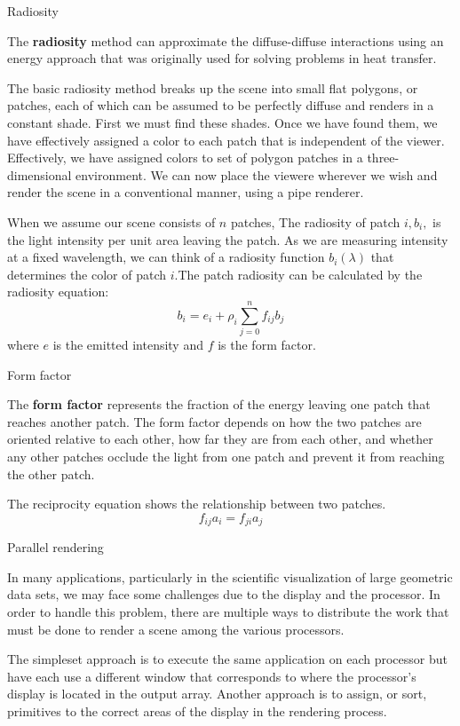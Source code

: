 \documentclass[10pt,a4paper]{article}
\begin{document}
\begin{enumerate}
		{\large \item Radiosity}
		
		The \textbf{radiosity} method can approximate the diffuse-diffuse interactions using an energy approach that was originally used for solving problems in heat transfer.
		
		The basic radiosity method breaks up the scene into small flat polygons, or patches, each of which can be assumed to be perfectly diffuse and renders in a constant shade. First we must find these shades. Once we have found them, we have effectively assigned a color to each patch that is independent of the viewer.
		Effectively, we have assigned colors to set of polygon patches in a three-dimensional environment. We can now place the viewere wherever we wish and render the scene in a conventional manner, using a pipe renderer.
		
		When we assume our scene consists of $ n $ patches, The radiosity of patch $ i, b_i, $ is the light intensity per unit area leaving the patch. As we are measuring intensity at a fixed wavelength, we can think of a radiosity function $ b_i(\lambda) $ that determines the color of patch $ i $.The patch radiosity can be calculated by the radiosity equation: $$ b_i = e_i + \rho_i \sum_{j=0}^{n} f_{ij} b_j $$ where $ e $ is the emitted intensity and $ f $ is the form factor.\\
		
		{\large \item Form factor}
		
		The \textbf{form factor} represents the fraction of the energy leaving one patch that reaches another patch. The form factor depends on how the two patches are oriented relative to each other, how far they are from each other, and whether any other patches occlude the light from one patch and prevent it from reaching the other patch. 
		
		The reciprocity equation shows the relationship between two patches. $$ f_{ij} a_i = f_{ji} a_j $$
		
		{\large \item Parallel rendering}
		
		In many applications, particularly in the scientific visualization of large geometric data sets, we may face some challenges due to the display and the processor. In order to handle this problem, there are multiple ways to distribute the work that must be done to render a scene among the various processors.
		
		The simpleset approach is to execute the same application on each processor but have each use a different window that corresponds to where the processor's display is located in the output array. Another approach is to assign, or sort, primitives to the correct areas of the display in the rendering process.\\
		

\end{enumerate}
\end{document}
